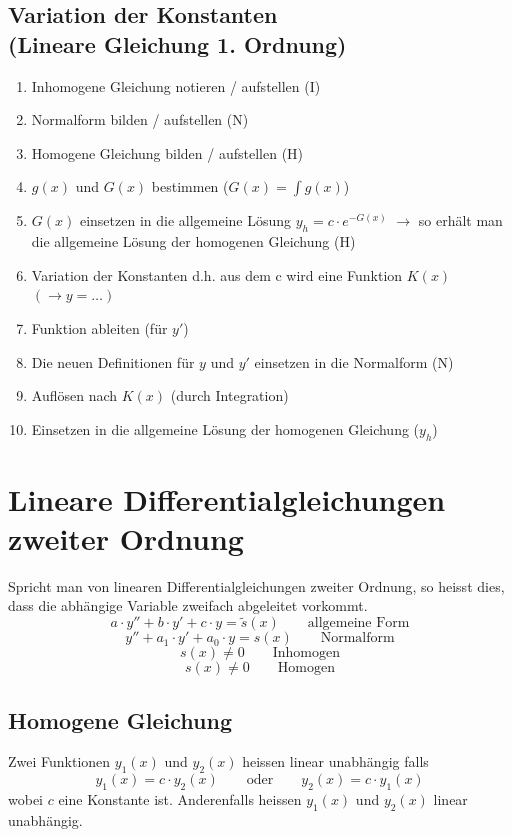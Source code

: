 
\newpage
\subsection{Variation der Konstanten \\(Lineare Gleichung 1. Ordnung)}
\begin{enumerate}
  \item Inhomogene Gleichung notieren / aufstellen (I)
  \item Normalform bilden / aufstellen (N)
  \item Homogene Gleichung bilden / aufstellen (H)
  \item $g(x)$ und $G(x)$ bestimmen ($G(x) = \int g(x)$)
  \item $G(x)$ einsetzen in die allgemeine Lösung $y_h=c \cdot e^{-G(x)}$
        $\rightarrow$ so erhält man die allgemeine Lösung der 
        homogenen Gleichung (H)
  \item Variation der Konstanten d.h. aus dem c wird eine Funktion $K(x)$ 
        $(\rightarrow y= \ldots)$
  \item Funktion ableiten (für $y'$)
  \item Die neuen Definitionen für $y$ und $y'$ einsetzen in die Normalform (N) 
  \item Auflösen nach $K(x)$ (durch Integration)
  \item Einsetzen in die allgemeine Lösung der homogenen Gleichung ($y_h$)
\end{enumerate}

\newpage

\section{Lineare Differentialgleichungen zweiter Ordnung}
Spricht man von linearen Differentialgleichungen zweiter Ordnung, 
so heisst dies, dass die abhängige Variable zweifach abgeleitet
vorkommt.
\[ a\cdot y'' + b \cdot y' + c \cdot y = \tilde{s}(x) 
   \qquad \text{allgemeine Form}\]
\[ y'' + a_1 \cdot y' + a_0 \cdot y = s(x) 
   \qquad \text{Normalform}\]
   \[  s(x) \neq 0 \qquad \text{Inhomogen} \]
   \[  s(x) \neq 0 \qquad \text{Homogen} \]

\subsection{Homogene Gleichung}
Zwei Funktionen $y_1(x)$ und $y_2(x)$ heissen linear unabhängig falls
\[ y_1(x)=c \cdot y_2(x) \qquad \text{oder} \qquad y_2(x)=c \cdot y_1(x) \]
wobei $c$ eine Konstante ist. Anderenfalls heissen $y_1(x)$ und $y_2(x)$
linear unabhängig.

